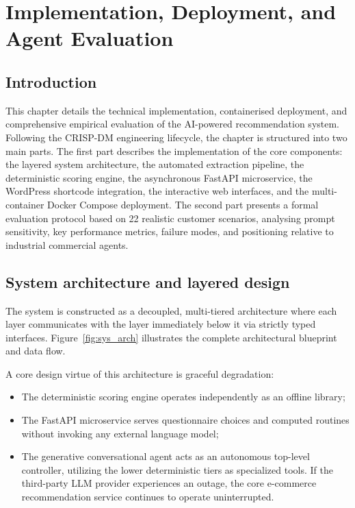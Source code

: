 ﻿%

\chapter{Implementation, Deployment, and Agent Evaluation}

\section{Introduction}

This chapter details the technical implementation, containerised deployment, and comprehensive empirical evaluation of the AI-powered recommendation system. Following the CRISP-DM engineering lifecycle, the chapter is structured into two main parts. The first part describes the implementation of the core components: the layered system architecture, the automated extraction pipeline, the deterministic scoring engine, the asynchronous FastAPI microservice, the WordPress shortcode integration, the interactive web interfaces, and the multi-container Docker Compose deployment. The second part presents a formal evaluation protocol based on 22 realistic customer scenarios, analysing prompt sensitivity, key performance metrics, failure modes, and positioning relative to industrial commercial agents.

\section{System architecture and layered design}

The system is constructed as a decoupled, multi-tiered architecture where each layer communicates with the layer immediately below it via strictly typed interfaces. Figure~\ref{fig:sys_arch} illustrates the complete architectural blueprint and data flow.


A core design virtue of this architecture is graceful degradation:
\begin{itemize}
  \item The deterministic scoring engine operates independently as an offline library;
  \item The FastAPI microservice serves questionnaire choices and computed routines without invoking any external language model;
  \item The generative conversational agent acts as an autonomous top-level controller, utilizing the lower deterministic tiers as specialized tools. If the third-party LLM provider experiences an outage, the core e-commerce recommendation service continues to operate uninterrupted.
\end{itemize}

